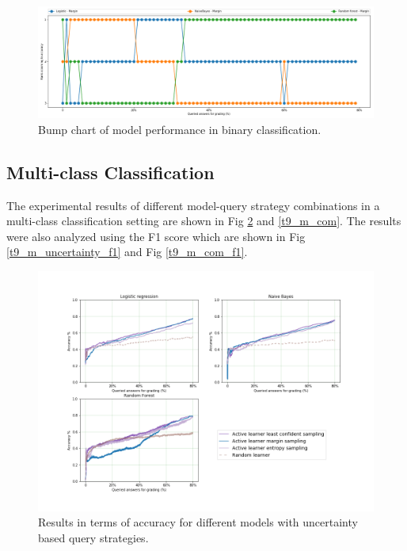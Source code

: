 \begin{figure}[!htb]
	\includegraphics[scale=0.3]{images/binary/task9_rank}
	\caption{Bump chart of model performance in binary classification.}
	\label{t9_b_bump}
\end{figure}


%	



\clearpage
\subsection{Multi-class Classification}

The experimental results of different model-query strategy combinations in a multi-class classification setting are shown in Fig \ref{t9_m_uncertainty} and \ref{t9_m_com}. The results were also analyzed using the F1 score which are shown in Fig \ref{t9_m_uncertainty_f1} and Fig \ref{t9_m_com_f1}.

\begin{figure}[!htb]
	\centering
	\includegraphics[scale=0.45]{images/task9_accuracy_uncertainty}
	\caption{Results in terms of accuracy for different models with uncertainty based query strategies.}
	\label{t9_m_uncertainty}
\end{figure}

